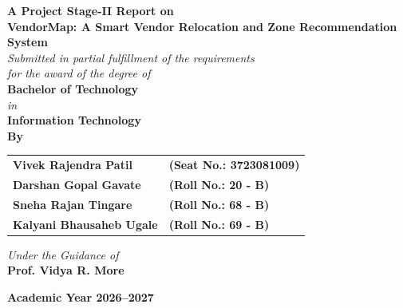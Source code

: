 \begin{titlepage}
\begin{center}

{\Large\textbf{A Project Stage-II Report on}}\\[0.8cm]

{\LARGE\textbf{VendorMap: A Smart Vendor Relocation and Zone Recommendation System}}\\[1.2cm]

{\large\textit{Submitted in partial fulfillment of the requirements}}\\[0.2cm]
{\large\textit{for the award of the degree of}}\\[0.4cm]
{\Large\textbf{Bachelor of Technology}}\\[0.2cm]
{\large\textit{in}}\\[0.2cm]
{\Large\textbf{Information Technology}}\\[1.2cm]

{\large\textbf{By}}\\[0.4cm]
\begin{table}[h!]
\centering
\begin{tabular}{ll}
\textbf{Vivek Rajendra Patil} & \textbf{(Seat No.: 3723081009)} \\
\textbf{Darshan Gopal Gavate} & \textbf{(Roll No.: 20 - B)} \\
\textbf{Sneha Rajan Tingare} & \textbf{(Roll No.: 68 - B)} \\
\textbf{Kalyani Bhausaheb Ugale} & \textbf{(Roll No.: 69 - B)} \\
\end{tabular}
\end{table}

\vspace{0.8cm}

{\large\textit{Under the Guidance of}}\\[0.3cm]
{\Large\textbf{Prof. Vidya R. More}}\\[1.2cm]


\vspace{0.8cm}

{\large\textbf{Academic Year 2026--2027}}

\end{center}
\end{titlepage}

